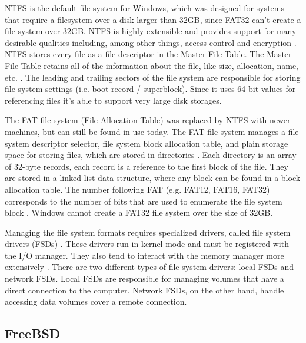 \documentclass[10pt,draftclsnofoot,onecolumn]{IEEEtran}
\begin{document}
\par NTFS is the default file system for Windows, which was designed for systems that require a filesystem over a disk larger than 32GB, since FAT32 can't create a file system over 32GB.
NTFS is highly extensible and provides support for many desirable qualities including, among other things, access control and encryption \cite{win:2}.
NTFS stores every file as a file descriptor in the Master File Table.
The Master File Table retains all of the information about the file, like size, allocation, name, etc. \cite{win:2}.
The leading and trailing sectors of the file system are responsible for storing file system settings (i.e. boot record / superblock).
Since it uses 64-bit values for referencing files it's able to support very large disk storages.

\par The FAT file system (File Allocation Table) was replaced by NTFS with newer machines, but can still be found in use today.
The FAT file system manages a file system descriptor selector, file system block allocation table, and plain storage space for storing files, which are stored in directories \cite{win:2}.
Each directory is an array of 32-byte records, each record is a reference to the first block of the file.
They are stored in a linked-list data structure, where any block can be found in a block allocation table.
The number following FAT (e.g. FAT12, FAT16, FAT32) corresponds to the number of bits that are used to enumerate the file system block \cite{win:2}.
Windows cannot create a FAT32 file system over the size of 32GB.

\par Managing the file system formats requires specialized drivers, called file system drivers (FSDs) \cite{win:2}.
These drivers run in kernel mode and must be registered with the I/O manager.
They also tend to interact with the memory manager more extensively \cite{win:2}.
There are two different types of file system drivers: local FSDs and network FSDs.
Local FSDs are responsible for managing volumes that have a direct connection to the computer.
Network FSDs, on the other hand, handle accessing data volumes cover a remote connection.

\subsection{FreeBSD}
\label{sub:File Systems FreeBSD}
\end{document}
